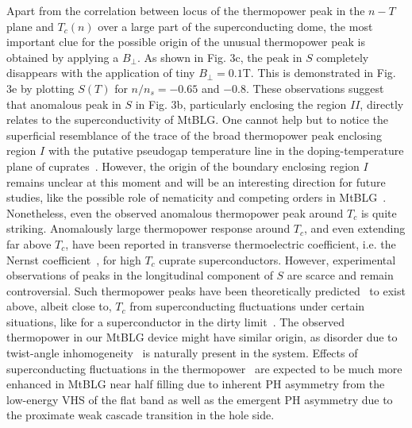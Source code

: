 \documentclass{nature}
\begin{document}
Apart from the correlation between locus of the thermopower peak in the $n-T$ plane and $T_c(n)$ over a large part of the superconducting dome, the most important clue for the possible origin of the unusual thermopower peak is obtained by applying a $B_{\perp}$. As shown in Fig. 3c, the peak in $S$ completely disappears with the application of tiny $B_\perp=0.1$T. This is demonstrated in Fig. 3e by plotting $S(T)$ for $n/n_{s} = -0.65$ and $-0.8$. %
These observations suggest that anomalous peak in $S$ in Fig. 3b, particularly enclosing the region $II$, directly relates to the superconductivity of MtBLG. One cannot help but to notice the superficial resemblance of the trace of the broad thermopower peak enclosing region $I$ with the putative pseudogap temperature line in the doping-temperature plane of cuprates~\cite{timusk_pseudogap_1999}. However, the origin of the boundary enclosing region $I$ remains unclear at this moment and will be an interesting direction for future studies, like the possible role of nematicity and competing orders in MtBLG~\cite{cao_nematicity_2021}. Nonetheless, even the observed anomalous thermopower peak around $T_{c}$ is quite striking. Anomalously large thermopower response around $T_{c}$, and even extending far above $T_{c}$, have been reported in transverse thermoelectric coefficient, i.e. the Nernst coefficient~\cite{xu_vortex-like_2000}, for high $T_{c}$ cuprate superconductors. However, experimental observations of peaks in the longitudinal component of $S$ are scarce \cite{howson_anomalous_1989} and remain controversial. Such thermopower peaks have been theoretically predicted~\cite{howson_anomalous_1989,lu_fluctuation_1995} to exist above, albeit close to, $T_c$ from superconducting fluctuations under certain situations, like for a superconductor in the dirty limit~\cite{howson_anomalous_1989,lu_fluctuation_1995}. %
The observed thermopower in our MtBLG device might have similar origin, as disorder due to twist-angle inhomogeneity~\cite{zondiner2020cascade,uri_mapping_2020} is naturally present in the system. Effects of superconducting fluctuations in the thermopower~\cite{howson_anomalous_1989,lu_fluctuation_1995} are expected to be much more enhanced in MtBLG near half filling due to inherent PH asymmetry from the low-energy VHS of the flat band as well as the emergent PH asymmetry due to the proximate weak cascade transition in the hole side.
\end{document}
